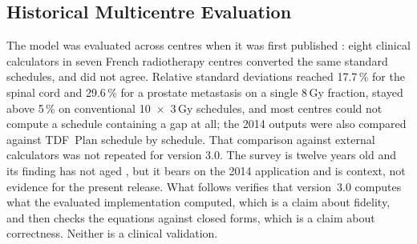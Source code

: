 \documentclass[preprint,12pt,number]{elsarticle}
\begin{document}
\subsection{Historical Multicentre Evaluation}
The model was evaluated across centres when it was first published \cite{voyant2014}: eight clinical calculators in seven French radiotherapy centres converted the same standard schedules, and did not agree. Relative standard deviations reached 17.7\,\% for the spinal cord and 29.6\,\% for a prostate metastasis on a single 8\,Gy fraction, stayed above 5\,\% on conventional 10~$\times$~3\,Gy schedules, and most centres could not compute a schedule containing a gap at all; the 2014 outputs were also compared against TDF~Plan \cite{tdfplan} schedule by schedule. That comparison against external calculators was not repeated for version 3.0. The survey is twelve years old and its finding has not aged \cite{voyant2026standard,wahlstedt2026,hardcastle2024}, but it bears on the 2014 application and is context, not evidence for the present release. What follows verifies that version~3.0 computes what the evaluated implementation computed, which is a claim about fidelity, and then checks the equations against closed forms, which is a claim about correctness. Neither is a clinical validation.
\end{document}
